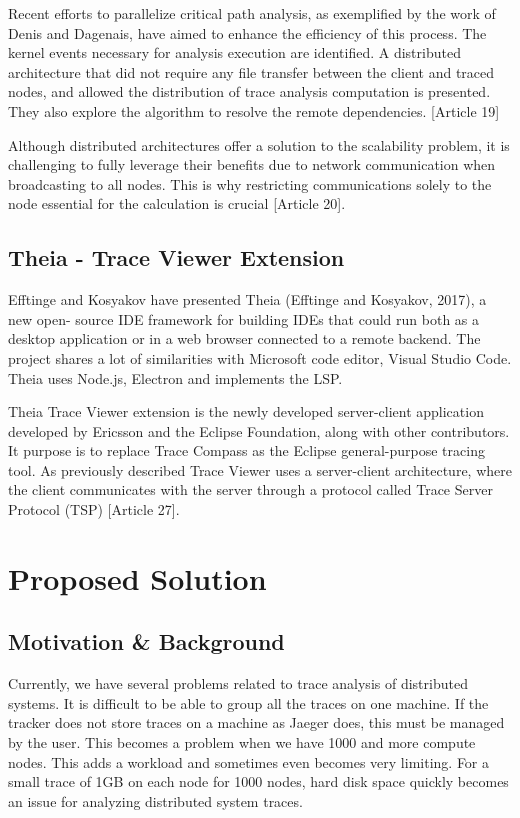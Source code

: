 Recent efforts to parallelize critical path analysis, as exemplified by the work of Denis and Dagenais, have aimed to enhance the efficiency of this process. The kernel events necessary for analysis execution are identified. A distributed architecture that did not require any file transfer between the client and traced nodes, and allowed the distribution of trace analysis computation is presented. They also explore the algorithm to resolve the remote dependencies. [Article 19]

Although distributed architectures offer a solution to the scalability problem, it is challenging to fully leverage their benefits due to network communication when broadcasting to all nodes. This is why restricting communications solely to the node essential for the calculation is crucial [Article 20].


\subsection{Theia - Trace Viewer Extension}

Eﬀtinge and Kosyakov have presented Theia (Eﬀtinge and Kosyakov, 2017), a new open-
source IDE framework for building IDEs that could run both as a desktop application or in
a web browser connected to a remote backend. The project shares a lot of similarities with
Microsoft code editor, Visual Studio Code. Theia uses Node.js, Electron and implements
the LSP.


Theia Trace Viewer extension is the newly developed server-client application developed by Ericsson and the Eclipse Foundation, along with other contributors. It purpose is to replace Trace Compass as the Eclipse general-purpose tracing tool. As previously described Trace Viewer uses a server-client architecture, where the client communicates with the server through a protocol called Trace Server Protocol (TSP) [Article 27].

\section{Proposed Solution}


\subsection{Motivation \& Background}

Currently, we have several problems related to trace analysis of distributed systems. It is difficult to be able to group all the traces on one machine. If the tracker does not store traces on a machine as Jaeger does, this must be managed by the user. This becomes a problem when we have 1000 and more compute nodes. This adds a workload and sometimes even becomes very limiting. For a small trace of 1GB on each node for 1000 nodes, hard disk space quickly becomes an issue for analyzing distributed system traces.

